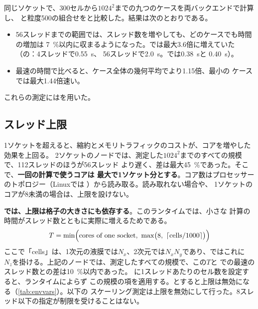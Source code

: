 同じソケットで、300セルから$1024^2$までの九つのケースを両バックエンドで計算し、
と粒度500の組合せをと比較した。結果は次のとおりである。
\begin{itemize}
  \item 56スレッドまでの範囲では、スレッド数を増やしても、どのケースでも時間の増加は
    \SI{7}{\percent}以内に収まるようになった。では最大3.6倍に増えていた
    （の：4スレッドで\SI{0.55}{\second}、
    56スレッドで\SI{2.0}{\second}。では\SI{0.38}{\second}と
    \SI{0.40}{\second}）。
  \item 最速の時間で比べると、ケース全体の幾何平均でより1.15倍、最小の
    ケースでは最大1.44倍速い。
\end{itemize}
これらの測定にはを用いた。

\subsection{スレッド上限}
\label{sec:parallel:cap}

1ソケットを超えると、縮約とメモリトラフィックのコストが、コアを増やした効果を上回る。
2ソケットのノードでは、測定した$1024^2$までのすべての規模で、112スレッドのほうが56スレッド
より遅く、差は最大\SI{45}{\percent}であった。そこで、\textbf{一回の計算で使うコアは
最大で1ソケット分とする}。コア数はプロセッサーのトポロジー（Linuxでは
）から読み取る。読み取れない場合や、
1ソケットのコアが8未満の場合は、上限を設けない。

\textbf{では、上限は格子の大きさにも依存する}。このランタイムでは、小さな
計算の時間がスレッド数とともに実際に増えるためである。
\[
  T = \min\Bigl(\text{cores of one socket},\ \max\bigl(8,\ \lceil \text{cells} / 1000 \rceil\bigr)\Bigr)
\]
ここで「cells」は、1次元の液膜では$N_x$、2次元では$N_x N_y$であり、ではこれに
$N_z$を掛ける。上記のノードでは、測定したすべての規模で、この$T$と
での最速のスレッド数との差は\SI{10}{\percent}以内であった。
に1スレッドあたりのセル数を設定すると、ランタイムによらず
この規模の項を適用する。とすると上限は無効になる（\cref{tab:envvars}）。以下の
スケーリング測定は上限を無効にして行った。8スレッド以下の指定が制限を受けることはない。

